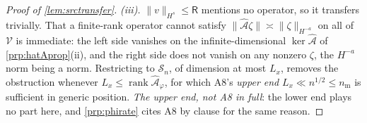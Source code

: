 \begin{proof}[Proof of \cref{lem:srctransfer}]
\emph{(iii).} $\|v\|_{H^{s}}\le\mathsf R$ mentions no operator, so it transfers trivially. That a
finite-rank operator cannot satisfy $\|\hat{\mathcal A}\zeta\|\asymp\|\zeta\|_{H^{-a}}$ on all of
$\mathcal V$ is immediate: the left side vanishes on the infinite-dimensional
$\ker\hat{\mathcal A}$ of \cref{prp:hatAprop}(ii), and the right side does not vanish on any nonzero
$\zeta$, the $H^{-a}$ norm being a norm. Restricting to $\mathcal S_n$, of dimension at most $L_x$, removes the
obstruction whenever $L_x\le\operatorname{rank}\hat{\mathcal A}_\varphi$, for which A8's \emph{upper
end} $L_x\ll n^{1/2}\le n_{\mathrm m}$ is sufficient in generic position. \emph{The upper end, not A8 in
full}: the lower end plays no part here, and \cref{prp:phirate} cites A8 by clause for the same reason.
\end{proof}

